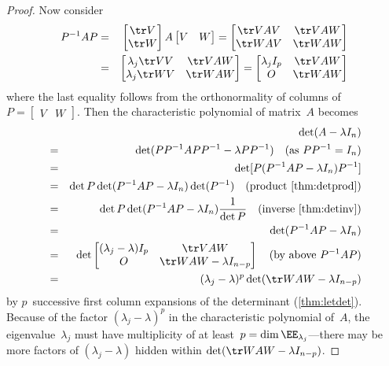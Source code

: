 \begin{proof}
Now consider
\begin{eqnarray*}
P^{-1}AP
&=&\begin{bmatrix} \tr V\\\tr W \end{bmatrix}A\begin{bmatrix} V&W \end{bmatrix}
=\begin{bmatrix} \tr VAV&\tr VAW\\\tr WAV&\tr WAW \end{bmatrix}
\\
&=&\begin{bmatrix} \lambda_j\tr VV&\tr VAW\\\lambda_j\tr WV&\tr WAW \end{bmatrix}
=\begin{bmatrix} \lambda_jI_p&\tr VAW\\O&\tr WAW \end{bmatrix}
\end{eqnarray*}
where the last equality follows from the orthonormality of columns of \(P=\begin{bmatrix} V&W \end{bmatrix}\).
Then the characteristic polynomial of matrix~\(A\) becomes
\begin{eqnarray*}
&&\hspace{-1.5em}\det(A-\lambda I_n)
\\&=&\det(PP^{-1}APP^{-1}-\lambda PP^{-1})
\quad(\text{as }PP^{-1}=I_n)
\\&=&\det[P(P^{-1}AP-\lambda I_n)P^{-1}]
\\&=&\det P\det(P^{-1}AP-\lambda I_n)\det(P^{-1})
\quad(\text{product \cref{thm:detprod}})
\\&=&\det P\det(P^{-1}AP-\lambda I_n)\frac1{\det P}
\quad(\text{inverse \cref{thm:detinv}})
\\&=&\det(P^{-1}AP-\lambda I_n)
\\&=&\det\begin{bmatrix} (\lambda_j-\lambda)I_p&\tr VAW\\O&\tr WAW -\lambda I_{n-p}\end{bmatrix}
\quad(\text{by above }P^{-1}AP)
\\&=&(\lambda_j-\lambda)^p\det(\tr WAW -\lambda I_{n-p})
\end{eqnarray*}
by \(p\)~successive first column expansions of the determinant (\cref{thm:letdet}).
Because of the factor \((\lambda_j-\lambda)^p\) in the characteristic polynomial of~\(A\), the eigenvalue~\(\lambda_j\) must have multiplicity of at least~\(p=\dim\EE_{\lambda_j}\)---there may be more factors of \((\lambda_j-\lambda)\) hidden within \(\det(\tr WAW -\lambda I_{n-p})\).
\end{proof}



